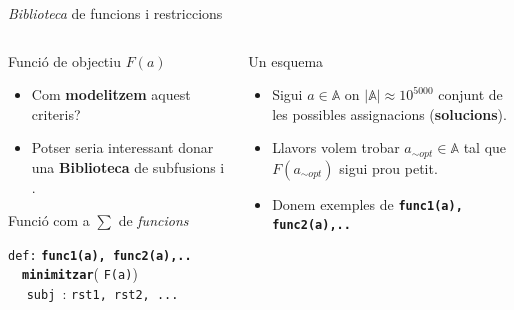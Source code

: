 \documentclass[twocolumn]{beamer}
\begin{document}
\begin{frame}{\textit{Biblioteca} de funcions i restriccions}
\begin{columns}[t]
	\begin{column}{.5\textwidth}
		\begin{block}{Funció de objectiu $F(a)$}
		\begin{itemize}
		 \item Com \textbf{modelitzem} aquest criteris?
		 \item Potser seria interessant donar una \textbf{Biblioteca} de subfusions i .
		\end{itemize}
		\end{block}
		
		\begin{block}{Funció com a $\sum$ de \textit{funcions}}
			
			\texttt{\color{green!75!black!75}def:} \texttt{\textbf{func1({\color{blue!75!black!75}a}), func2({\color{blue!75!black!75}a}),.. }}
			\\
			$\quad$\texttt{\color{purple!75!black!75}\textbf{minimitzar}}( \texttt{F({\color{blue!75!black!75}a})})
			\\ 	
			$\quad$ \texttt{\color{red!75!black!75}subj }: \texttt{rst1, rst2, ...}
			\\
		\end{block}
	\end{column}
	\begin{column}{.5\textwidth}
		\begin{block}{Un esquema}
		\begin{itemize}
		 \item Sigui $a \in \mathbb{A}$ on $|\mathbb{A}|\approx10^{5000}$ conjunt de les possibles assignacions (\textbf{solucions}).
		 \item Llavors volem trobar $a_{\sim opt} \in \mathbb{A}$
		 tal que $F(a_{\sim opt})$ sigui prou petit.
		 \item Donem exemples de \texttt{\textbf{func1({\color{blue!75!black!75}a}), func2({\color{blue!75!black!75}a}),.. }}
		  \end{itemize}
		\end{block}
	\end{column}
\end{columns}
\end{frame}
\end{document}
